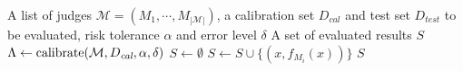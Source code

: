 \begin{algorithm}[t]
\caption{Cascaded Selective Evaluation}\label{alg:cascaded_selective_evaluation}
\begin{algorithmic}
\Require A list of judges $\mathcal{M} = (M_1, \cdots, M_{|\mathcal{M}|})$, a calibration set $D_\textit{cal}$ and test set $D_\textit{test}$ to be evaluated, risk tolerance $\alpha$ and error level $\delta$
\Ensure A set of evaluated results $S$
\State $\Lambda \gets \operatorname*{calibrate}(\mathcal{M}, D_\textit{cal}, \alpha, \delta)$ 
\State $S \gets \emptyset$ 
     
         
            \State $S \gets S \cup \{(x, f_{M_i}(x))\}$
            \State \Break
        \EndIf
    \EndFor
\EndFor
\Return $S$ 
\end{algorithmic}
\end{algorithm}